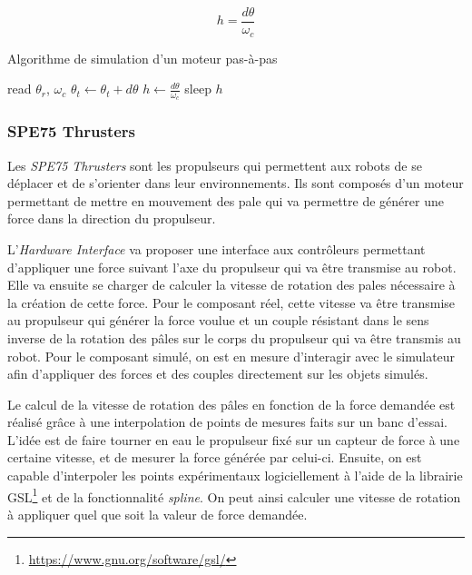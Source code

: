 				$$h = \frac{d\theta}{\omega_c}$$

				\begin{algorithm}[!htb]
					\caption{Algorithme de simulation d'un moteur pas-à-pas}
					\label{algo:stepper_motor}
					\begin{algorithmic}
							\STATE read $\theta_r$, $\omega_c$
								\STATE $\theta_t \leftarrow \theta_t + d\theta$
							\ENDIF
							\STATE $h \leftarrow \frac{d\theta}{\omega_c}$
							\STATE sleep $h$
						\ENDWHILE
					\end{algorithmic}
				\end{algorithm}

			\subsubsection{SPE75 Thrusters}
		
				Les \textit{SPE75 Thrusters} sont les propulseurs qui permettent aux robots de se déplacer et de s'orienter dans leur environnements. Ils sont composés d'un moteur permettant de mettre en mouvement des pale qui va permettre de générer une force dans la direction du propulseur.
				
				L'\textit{Hardware Interface} va proposer une interface aux contrôleurs permettant d'appliquer une force suivant l'axe du propulseur qui va être transmise au robot. Elle va ensuite se charger de calculer la vitesse de rotation des pales nécessaire à la création de cette force. Pour le composant réel, cette vitesse va être transmise au propulseur qui générer la force voulue et un couple résistant dans le sens inverse de la rotation des pâles sur le corps du propulseur qui va être transmis au robot. Pour le composant simulé, on est en mesure d'interagir avec le simulateur afin d'appliquer des forces et des couples directement sur les objets simulés. 
				
				Le calcul de la vitesse de rotation des pâles en fonction de la force demandée est réalisé grâce à une interpolation de points de mesures faits sur un banc d'essai. L'idée est de faire tourner en eau le propulseur fixé sur un capteur de force à une certaine vitesse, et de mesurer la force générée par celui-ci. Ensuite, on est capable d'interpoler les points expérimentaux logiciellement à l'aide de la librairie \gls{GSL}\footnote{\url{https://www.gnu.org/software/gsl/}} et de la fonctionnalité \textit{spline}. On peut ainsi calculer une vitesse de rotation à appliquer quel que soit la valeur de force demandée.
				
